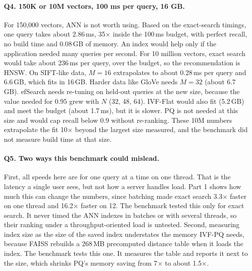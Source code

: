 \documentclass[10pt,a4paper]{article}
\begin{document}
\paragraph{Q4. 150K or 10M vectors, 100 ms per query, 16 GB.}
For 150,000 vectors, ANN is not worth using. Based on the exact-search timings, one query takes about 2.86\,ms, 35$\times$ inside
the 100\,ms budget, with perfect recall, no build time and 0.08\,GB of memory. An index would help only if the application needed
many queries per second. For 10 million vectors, exact search would take about 236\,ms per query, over the budget, so the
recommendation is HNSW. On SIFT-like data, $M = 16$ extrapolates to about 0.28\,ms per query and 6.6\,GB, which fits in 16\,GB.
Harder data like GloVe needs $M = 32$ (about 6.7\,GB). efSearch needs re-tuning on held-out queries at the new size, because the
value needed for 0.95 grew with $N$ (32, 48, 64). IVF-Flat would also fit (5.2\,GB) and meet the budget (about 1.7\,ms), but it is
slower. PQ is not needed at this size and would cap recall below 0.9 without re-ranking. These 10M numbers extrapolate the fit
10$\times$ beyond the largest size measured, and the benchmark did not measure build time at that size.

\paragraph{Q5. Two ways this benchmark could mislead.}
First, all speeds here are for one query at a time on one thread. That is the latency a single user sees, but not how a server
handles load. Part 1 shows how much this can change the numbers, since batching made exact search 3.3$\times$ faster on one thread and 16.2$\times$ faster on 12. The benchmark tested this only for exact search. It never timed the ANN indexes in batches or with several threads, so their ranking under a throughput-oriented load is untested. Second, measuring index size as the size of the saved index
understates the memory IVF-PQ needs, because FAISS rebuilds a 268\,MB precomputed distance table when it loads the index. The benchmark tests this one. It measures the table and reports it next to the size, which shrinks PQ's memory saving from 7$\times$ to
about 1.5$\times$.
\end{document}
